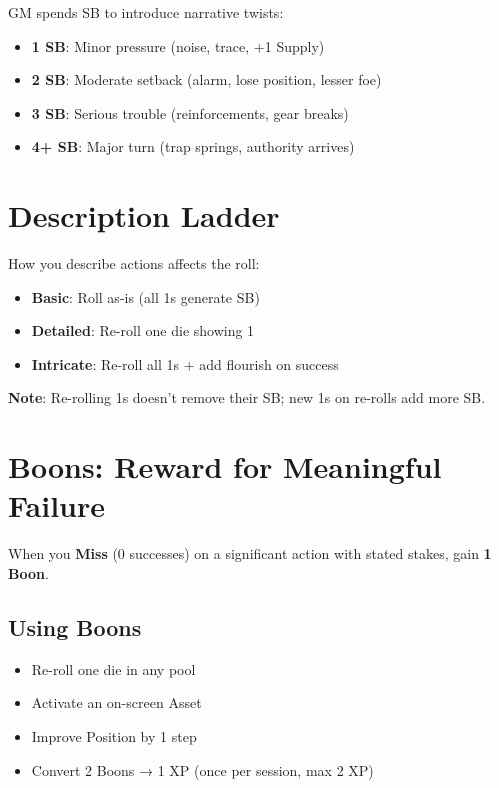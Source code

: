 \documentclass[11pt]{article}
\begin{document}
\begin{fatebox}
GM spends SB to introduce narrative twists:
\begin{itemize}
    \item \textbf{1 SB}: Minor pressure (noise, trace, +1 Supply)
    \item \textbf{2 SB}: Moderate setback (alarm, lose position, lesser foe)
    \item \textbf{3 SB}: Serious trouble (reinforcements, gear breaks)
    \item \textbf{4+ SB}: Major turn (trap springs, authority arrives)
\end{itemize}
\end{fatebox}

\section{Description Ladder}

How you describe actions affects the roll:
\begin{itemize}
    \item \textbf{Basic}: Roll as-is (all 1s generate SB)
    \item \textbf{Detailed}: Re-roll one die showing 1
    \item \textbf{Intricate}: Re-roll all 1s + add flourish on success
\end{itemize}

\textbf{Note}: Re-rolling 1s doesn't remove their SB; new 1s on re-rolls add more SB.

\section{Boons: Reward for Meaningful Failure}

When you \textbf{Miss} (0 successes) on a significant action with stated stakes, gain \textbf{1 Boon}.

\subsection{Using Boons}
\begin{itemize}
    \item Re-roll one die in any pool
    \item Activate an on-screen Asset
    \item Improve Position by 1 step
    \item Convert 2 Boons → 1 XP (once per session, max 2 XP)
\end{itemize}
\end{document}
